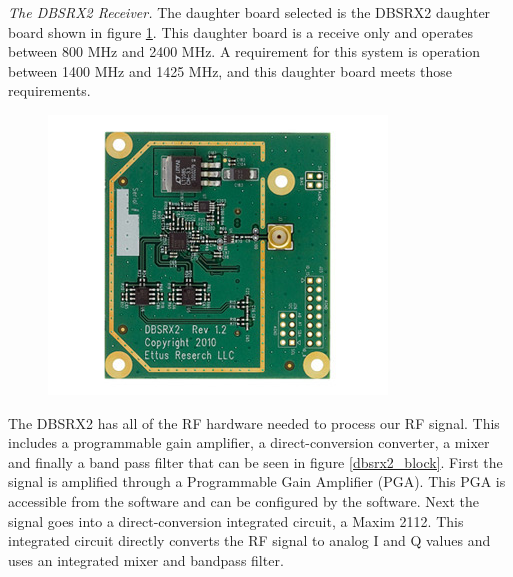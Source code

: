 
\emph{The DBSRX2 Receiver.}  The daughter board selected is the DBSRX2 daughter board shown in figure \ref{dbsrx2}.  This daughter board is a receive only and operates between 800 MHz and 2400 MHz.  A requirement for this system is operation between 1400 MHz and 1425 MHz, and this daughter board meets those requirements.  

{\begin{figure}[h!tb] 
\centering
\includegraphics{Images/dbsrx2.jpg}
\label{dbsrx2}
\end{figure}
}

The DBSRX2 has all of the RF hardware needed to process our RF signal.  This includes a programmable gain amplifier, a direct-conversion converter, a mixer and finally a band pass filter that can be seen in figure \ref{dbsrx2_block}.  First the signal is amplified through a Programmable Gain Amplifier (PGA).  This PGA is accessible from the software and can be configured by the software.  Next the signal goes into a direct-conversion integrated circuit, a Maxim 2112.  This integrated circuit directly converts the RF signal to analog I and Q values and uses an integrated mixer and bandpass filter.

